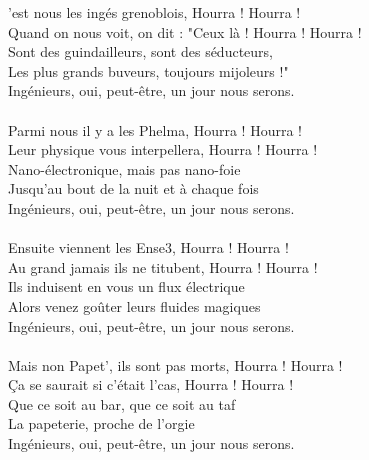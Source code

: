 
'est nous les ingés grenoblois, Hourra ! Hourra !
\\Quand on nous voit, on dit : "Ceux là ! Hourra ! Hourra !
\\Sont des guindailleurs, sont des séducteurs,
\\Les plus grands buveurs, toujours mijoleurs !"
\\Ingénieurs, oui, peut-être, un jour nous serons.
\\\\Parmi nous il y a les Phelma, Hourra ! Hourra !
\\Leur physique vous interpellera, Hourra ! Hourra !
\\Nano-électronique, mais pas nano-foie
\\Jusqu'au bout de la nuit et à chaque fois
\\Ingénieurs, oui, peut-être, un jour nous serons.
\\\\Ensuite viennent les Ense3, Hourra ! Hourra !
\\Au grand jamais ils ne titubent, Hourra ! Hourra !
\\Ils induisent en vous un flux électrique
\\Alors venez goûter leurs fluides magiques
\\Ingénieurs, oui, peut-être, un jour nous serons.
\\\\Mais non Papet', ils sont pas morts, Hourra ! Hourra !
\\Ça se saurait si c'était l'cas, Hourra ! Hourra !
\\Que ce soit au bar, que ce soit au taf
\\La papeterie, proche de l'orgie
\\Ingénieurs, oui, peut-être, un jour nous serons.
